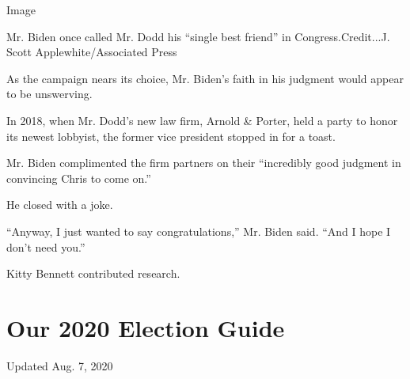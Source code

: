 Image

Mr. Biden once called Mr. Dodd his ``single best friend'' in
Congress.Credit...J. Scott Applewhite/Associated Press

As the campaign nears its choice, Mr. Biden's faith in his judgment
would appear to be unswerving.

In 2018, when Mr. Dodd's new law firm, Arnold \& Porter, held a party to
honor its newest lobbyist, the former vice president stopped in for a
toast.

Mr. Biden complimented the firm partners on their ``incredibly good
judgment in convincing Chris to come on.''

He closed with a joke.

``Anyway, I just wanted to say congratulations,'' Mr. Biden said. ``And
I hope I don't need you.''

Kitty Bennett contributed research.

\hypertarget{our-2020-election-guide}{%
\section{Our 2020 Election Guide}\label{our-2020-election-guide}}

Updated Aug. 7, 2020

